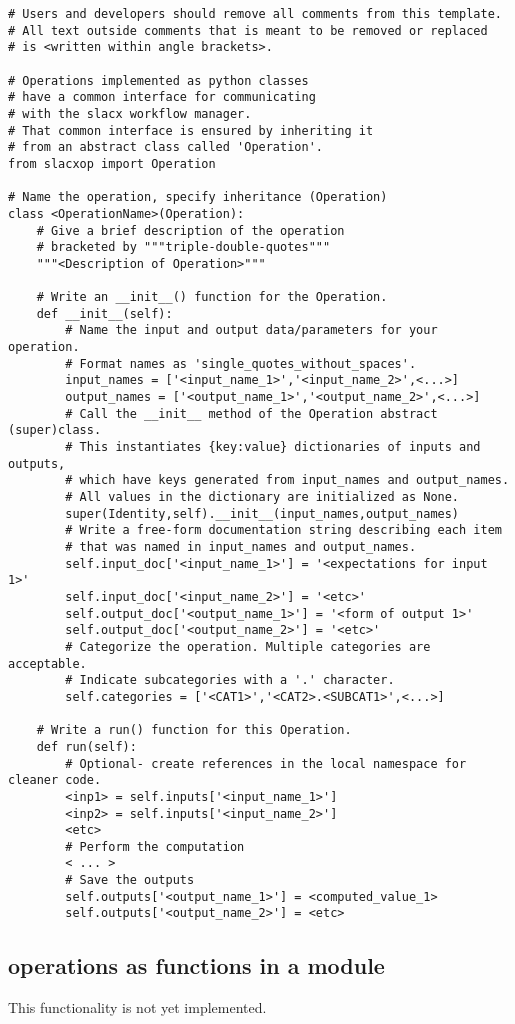 \lstset{language=Python}
\begin{lstlisting}
# Users and developers should remove all comments from this template.
# All text outside comments that is meant to be removed or replaced 
# is <written within angle brackets>.

# Operations implemented as python classes 
# have a common interface for communicating 
# with the slacx workflow manager.
# That common interface is ensured by inheriting it
# from an abstract class called 'Operation'.
from slacxop import Operation

# Name the operation, specify inheritance (Operation)
class <OperationName>(Operation):
    # Give a brief description of the operation
    # bracketed by """triple-double-quotes"""
    """<Description of Operation>"""

    # Write an __init__() function for the Operation.
    def __init__(self):
        # Name the input and output data/parameters for your operation.
        # Format names as 'single_quotes_without_spaces'.
        input_names = ['<input_name_1>','<input_name_2>',<...>]
        output_names = ['<output_name_1>','<output_name_2>',<...>]
        # Call the __init__ method of the Operation abstract (super)class.
        # This instantiates {key:value} dictionaries of inputs and outputs, 
        # which have keys generated from input_names and output_names.
        # All values in the dictionary are initialized as None. 
        super(Identity,self).__init__(input_names,output_names)
        # Write a free-form documentation string describing each item
        # that was named in input_names and output_names.
        self.input_doc['<input_name_1>'] = '<expectations for input 1>'
        self.input_doc['<input_name_2>'] = '<etc>'
        self.output_doc['<output_name_1>'] = '<form of output 1>'
        self.output_doc['<output_name_2>'] = '<etc>'
        # Categorize the operation. Multiple categories are acceptable.
        # Indicate subcategories with a '.' character.
        self.categories = ['<CAT1>','<CAT2>.<SUBCAT1>',<...>]
        
    # Write a run() function for this Operation.
    def run(self):
        # Optional- create references in the local namespace for cleaner code.
        <inp1> = self.inputs['<input_name_1>']
        <inp2> = self.inputs['<input_name_2>']
        <etc>
        # Perform the computation
        < ... >
        # Save the outputs
        self.outputs['<output_name_1>'] = <computed_value_1>
        self.outputs['<output_name_2>'] = <etc>
\end{lstlisting}


\subsection{operations as functions in a module}
\label{sec:op_dev_by_function}

This functionality is not yet implemented.


